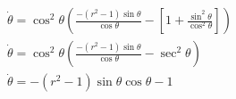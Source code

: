 \documentclass[12pt]{article}
\begin{document}
\begin{enumerate}
\begin{enumerate}
\begin{gather*}
                \dot{\theta}=\cos^2{\theta}\left(\frac{-\left(r^2-1\right)\sin\theta}{\cos\theta}-\left[1+\frac{\sin^2\theta}{\cos^2\theta}\right]\right)\\
                \dot{\theta}=\cos^2{\theta}\left(\frac{-\left(r^2-1\right)\sin\theta}{\cos\theta}-\sec^2\theta\right)\\
                \dot{\theta}=-\left(r^2-1\right)\sin\theta\cos\theta-1\\
            \end{gather*}
        \end{enumerate}
    \end{enumerate}
\end{document}
